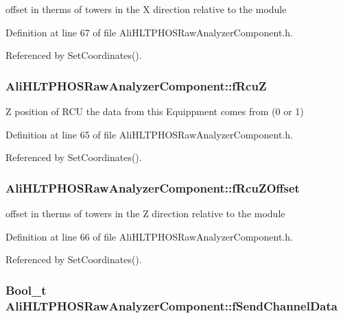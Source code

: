offset in therms of towers in the X direction relative to the module 

Definition at line 67 of file Ali\-HLTPHOSRaw\-Analyzer\-Component.h.

Referenced by Set\-Coordinates().
\subsubsection{ {\bf Ali\-HLTPHOSRaw\-Analyzer\-Component::f\-Rcu\-Z}\hspace{0.3cm}{\tt  [private]}}\label{classAliHLTPHOSRawAnalyzerComponent_r3}


Z position of RCU the data from this Equippment comes from (0 or 1) 

Definition at line 65 of file Ali\-HLTPHOSRaw\-Analyzer\-Component.h.

Referenced by Set\-Coordinates().
\subsubsection{ {\bf Ali\-HLTPHOSRaw\-Analyzer\-Component::f\-Rcu\-ZOffset}\hspace{0.3cm}{\tt  [private]}}\label{classAliHLTPHOSRawAnalyzerComponent_r4}


offset in therms of towers in the Z direction relative to the module 

Definition at line 66 of file Ali\-HLTPHOSRaw\-Analyzer\-Component.h.

Referenced by Set\-Coordinates().
\subsubsection{\setlength{\rightskip}{0pt plus 5cm}Bool\_\-t {\bf Ali\-HLTPHOSRaw\-Analyzer\-Component::f\-Send\-Channel\-Data}\hspace{0.3cm}{\tt  [private]}}\label{classAliHLTPHOSRawAnalyzerComponent_r7}


